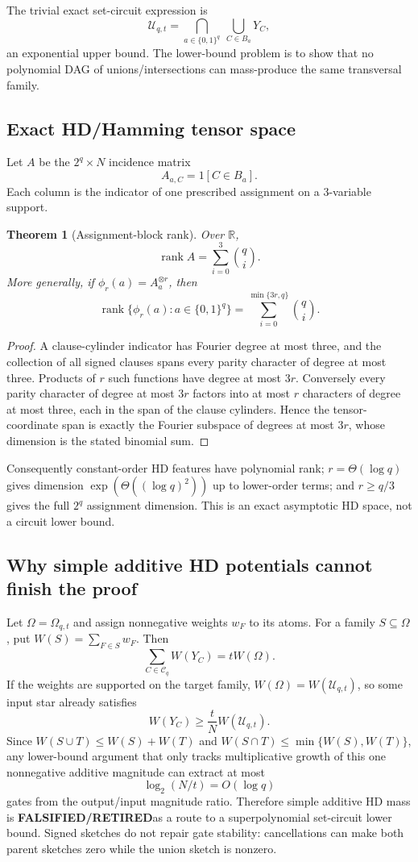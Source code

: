 \documentclass[11pt]{article}
\newtheorem{theorem}{Theorem}
\newcommand{\RET}{\textbf{FALSIFIED/RETIRED}}
\begin{document}
The trivial exact set-circuit expression is
\[\mathcal U_{q,t}=\bigcap_{a\in\{0,1\}^q}\ \bigcup_{C\in B_a}Y_C,\]
an exponential upper bound. The lower-bound problem is to show that no polynomial DAG of unions/intersections can mass-produce the same transversal family.

\subsection{Exact HD/Hamming tensor space}
Let $A$ be the $2^q\times N$ incidence matrix
\[A_{a,C}=1[C\in B_a].\]
Each column is the indicator of one prescribed assignment on a 3-variable support.

\begin{theorem}[Assignment-block rank]
Over $\mathbb R$,
\[\operatorname{rank}A=\sum_{i=0}^3\binom qi.\]
More generally, if $\phi_r(a)=A_a^{\otimes r}$, then
\[\boxed{\operatorname{rank}\{\phi_r(a):a\in\{0,1\}^q\}=\sum_{i=0}^{\min\{3r,q\}}\binom qi.}\]
\end{theorem}
\begin{proof}
A clause-cylinder indicator has Fourier degree at most three, and the collection of all signed clauses spans every parity character of degree at most three. Products of $r$ such functions have degree at most $3r$. Conversely every parity character of degree at most $3r$ factors into at most $r$ characters of degree at most three, each in the span of the clause cylinders. Hence the tensor-coordinate span is exactly the Fourier subspace of degrees at most $3r$, whose dimension is the stated binomial sum.
\end{proof}

Consequently constant-order HD features have polynomial rank; $r=\Theta(\log q)$ gives dimension $\exp(\Theta((\log q)^2))$ up to lower-order terms; and $r\ge q/3$ gives the full $2^q$ assignment dimension. This is an exact asymptotic HD space, not a circuit lower bound.

\subsection{Why simple additive HD potentials cannot finish the proof}
Let $\Omega=\Omega_{q,t}$ and assign nonnegative weights $w_F$ to its atoms. For a family $S\subseteq\Omega$, put $W(S)=\sum_{F\in S}w_F$. Then
\[\sum_{C\in\mathcal C_q}W(Y_C)=tW(\Omega).\]
If the weights are supported on the target family, $W(\Omega)=W(\mathcal U_{q,t})$, so some input star already satisfies
\[W(Y_C)\ge \frac tN W(\mathcal U_{q,t}).\]
Since $W(S\cup T)\le W(S)+W(T)$ and $W(S\cap T)\le\min\{W(S),W(T)\}$, any lower-bound argument that only tracks multiplicative growth of this one nonnegative additive magnitude can extract at most
\[\log_2(N/t)=O(\log q)\]
gates from the output/input magnitude ratio. Therefore simple additive HD mass is \RET as a route to a superpolynomial set-circuit lower bound. Signed sketches do not repair gate stability: cancellations can make both parent sketches zero while the union sketch is nonzero.
\end{document}
